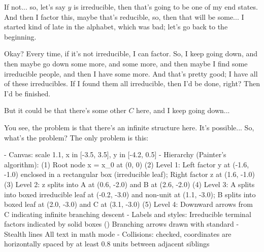 \begin{proofWrapper}
\begin{speech}[01:02:42 - 01:04:42]
If not... so, let's say $y$ is irreducible, then that's going to be one of my end states. And then I factor this, maybe that's reducible, so, then that will be some... I started kind of late in the alphabet, which was bad; let's go back to the beginning. 

Okay? Every time, if it's not irreducible, I can factor. So, I keep going down, and then maybe go down some more, and some more, and then maybe I find some irreducible people, and then I have some more. And that's pretty good; I have all of these irreducibles. If I found them all irreducible, then I'd be done, right? Then I'd be finished.

But it could be that there's some other $C$ here, and I keep going down... 

You see, the problem is that there's an infinite structure here. It's possible... So, what's the problem? The only problem is this:
\end{speech}

\begin{content}
\begin{hidden}
- Canvas: scale 1.1, x in [-3.5, 3.5], y in [-4.2, 0.5]
- Hierarchy (Painter's algorithm):
  (1) Root node x = x_0 at (0, 0)
  (2) Level 1: Left factor y at (-1.6, -1.0) enclosed in a rectangular box (irreducible leaf); Right factor z at (1.6, -1.0)
  (3) Level 2: z splits into A at (0.6, -2.0) and B at (2.6, -2.0)
  (4) Level 3: A splits into boxed irreducible leaf at (-0.2, -3.0) and non-unit at (1.1, -3.0); B splits into boxed leaf at (2.0, -3.0) and C at (3.1, -3.0)
  (5) Level 4: Downward arrows from C indicating infinite branching descent
- Labels and styles:
  Irreducible terminal factors indicated by solid boxes (\boxed{\dots})
  Branching arrows drawn with standard -{Stealth} lines
  All text in math mode
- Collisions: checked, coordinates are horizontally spaced by at least 0.8 units between adjacent siblings
\end{hidden}
\begin{center}
\end{center}
\end{content}
\end{proofWrapper}
